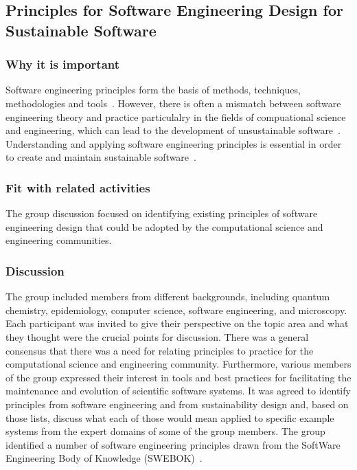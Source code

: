\subsection{Principles for Software Engineering Design for Sustainable Software} 

\subsubsection{Why it is important}

Software engineering principles form the basis of methods, techniques, methodologies and tools~\cite{}. However, there is often a mismatch between software engineering theory and practice particulalry in the fields of compuational science and engineering, which can lead to the development of unsustainable software~\cite{}. Understanding and applying software engineering principles is essential in order to create and maintain sustainable software~\cite{}.

\subsubsection{Fit with related activities}
The group discussion focused on identifying existing principles of software engineering design that could be adopted by the computational science and engineering communities.

\subsubsection{Discussion}

The group included members from different backgrounds, including quantum chemistry, epidemiology, computer science, software engineering, and microscopy. Each participant was invited to give their perspective on the topic area and what they thought were the crucial points for discussion. There was a general consensus that there was a need for relating principles to practice for the computational science and engineering community. Furthermore, various members of the group expressed their interest in tools and best practices for facilitating the maintenance and evolution of scientific software systems. It was agreed to identify principles from software engineering and from sustainability design and, based on those lists, discuss what each of those would mean applied to specific example systems from the expert domains of some of the group members. The group identified a number of software engineering principles drawn from the SoftWare Engineering Body of Knowledge (SWEBOK)~\cite{swebokv3}. 


